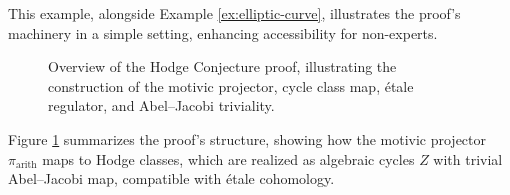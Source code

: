 \documentclass[11pt]{article}
\DeclareMathOperator{\cl}{cl}
\DeclareMathOperator{\CH}{CH}
\DeclareMathOperator{\AJ}{AJ}
\begin{document}
This example, alongside Example \ref{ex:elliptic-curve}, illustrates the proof’s machinery in a simple setting, enhancing accessibility for non-experts.

\begin{figure}[h]
\centering
{}
\caption{Overview of the Hodge Conjecture proof, illustrating the construction of the motivic projector, cycle class map, étale regulator, and Abel--Jacobi triviality.}
\label{fig:proof-overview}
\end{figure}

Figure \ref{fig:proof-overview} summarizes the proof’s structure, showing how the motivic projector \(\pi_{\mathrm{arith}}\) maps to Hodge classes, which are realized as algebraic cycles \(Z\) with trivial Abel--Jacobi map, compatible with étale cohomology.
\end{document}
